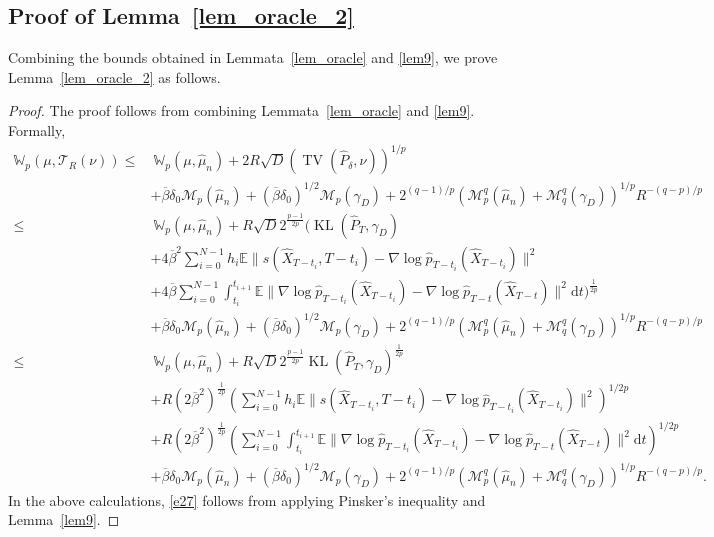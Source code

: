 \documentclass[12pts]{article}
\newcommand{\diff}{\mathrm{d}}
\newcommand{\sM}{ \mathscr{M}}
\newcommand{\sT}{ \mathscr{T}}
\newcommand{\hP}{ \hat{P}}
\newcommand{\hX}{ \widehat{X}}
\newcommand{\hmu}{\hat{\mu}}
\newcommand{\E}{\mathbb{E}}
\newcommand{\fW}{\mathbb{W}}
\newcommand{\hp}{\hat{p}}
\newcommand{\tv}{\operatorname{TV}}
\newcommand{\kl}{\operatorname{KL}}
\begin{document}
\subsection{Proof of Lemma~\ref{lem_oracle_2}}
Combining the bounds obtained in Lemmata~\ref{lem_oracle} and \ref{lem9}, we prove Lemma~\ref{lem_oracle_2} as follows.
\lemoracle*
\begin{proof}
The proof follows from combining Lemmata~\ref{lem_oracle} and \ref{lem9}. Formally,
\begingroup
\allowdisplaybreaks
\begin{align}
      \fW_p(\mu, \sT_R(\nu)) 
     \le & \ \fW_p(\mu, \hmu_n) + 2R\sqrt{D} \left(\tv(\hP_{\delta}, \nu)\right)^{1/p} \nonumber\\
        & +   \overline{\beta}\delta_0 \sM_p(\hmu_n) + (\overline{\beta}\delta_0)^{1/2} \sM_p(\gamma_D)  + 2^{(q-1)/p} \left( \sM_p^q(\hmu_n) +   \sM_q^q(\gamma_D) \right)^{1/p} R^{-(q-p)/p} \nonumber\\
        \le & \ \fW_p(\mu, \hmu_n) + R \sqrt{D} 2^{\frac{p-1}{2p}} \bigg(\kl(\hP_T, \gamma_D) \nonumber\\
        & + 4 \overline{\beta}^2 \sum_{i=0}^{N-1} h_i \E \|s(\hX_{T-t_i}, T-t_i) - \nabla \log \hp_{T-t_i}(\hX_{T-t_i})\|^2   \nonumber\\
  & +  4 \overline{\beta} \sum_{i=0}^{N-1}\int_{t_i}^{t_{i+1}} \E\|\nabla \log \hp_{T-t_i}(\hX_{T-t_i}) - \nabla \log \hp_{T-t}(\hX_{T-t})\|^2 \diff  t\bigg)^{\frac{1}{2p}} \nonumber\\
        & +   \overline{\beta}\delta_0 \sM_p(\hmu_n) + (\overline{\beta}\delta_0)^{1/2} \sM_p(\gamma_D)  + 2^{(q-1)/p} \left( \sM_p^q(\hmu_n) +   \sM_q^q(\gamma_D) \right)^{1/p} R^{-(q-p)/p} \label{e27}\\
        \le & \ \fW_p(\mu, \hmu_n) + R \sqrt{D} 2^{\frac{p-1}{2p}} \kl(\hP_T, \gamma_D)^{\frac{1}{2p}} \nonumber\\
        & + R (2\overline{\beta}^2 )^{\frac{1}{2p}} \left(\sum_{i=0}^{N-1} h_i \E \|s(\hX_{T-t_i}, T-t_i) - \nabla \log \hp_{T-t_i}(\hX_{T-t_i})\|^2 \right)^{1/2p} \nonumber\\
        & + R (2\overline{\beta}^2 )^{\frac{1}{2p}} \left(\sum_{i=0}^{N-1}\int_{t_i}^{t_{i+1}} \E\|\nabla \log \hp_{T-t_i}(\hX_{T-t_i}) - \nabla \log \hp_{T-t}(\hX_{T-t})\|^2 \diff  t\right)^{1/2p} \nonumber\\
        & +  \overline{\beta}\delta_0 \sM_p(\hmu_n) + (\overline{\beta}\delta_0)^{1/2} \sM_p(\gamma_D)  + 2^{(q-1)/p} \left( \sM_p^q(\hmu_n) +   \sM_q^q(\gamma_D) \right)^{1/p} R^{-(q-p)/p} .\nonumber
\end{align}
\endgroup
In the above calculations, \eqref{e27} follows from applying Pinsker's inequality and Lemma~\ref{lem9}.
\end{proof}
\end{document}
